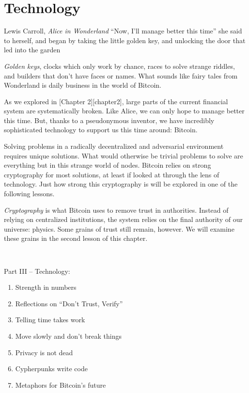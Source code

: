 \part{Technology}
\label{ch:technology}

\begin{chapquote}{Lewis Carroll, \textit{Alice in Wonderland}}
``Now, I'll manage better this time'' she said to herself, and began by taking
the little golden key, and unlocking the door that led into the garden
\end{chapquote}

\textit{Golden keys}, clocks which only work by chance, races to solve
strange riddles, and builders that don't have faces or names. What sounds like
fairy tales from Wonderland is daily business in the world of Bitcoin.

As we explored in [Chapter 2][chapter2], large parts of the current financial
system are systematically broken. Like Alice, we can only hope to manage better
this time. But, thanks to a pseudonymous inventor, we have incredibly
sophisticated technology to support us this time around: Bitcoin.

Solving problems in a radically decentralized and adversarial environment
requires unique solutions. What would otherwise be trivial problems to solve
are everything but in this strange world of nodes. Bitcoin relies on strong
cryptography for most solutions, at least if looked at through the lens of
technology. Just how strong this cryptography is will be explored in one of the
following lessons.

\textit{Cryptography} is what Bitcoin uses to remove trust in authorities.
Instead of relying on centralized institutions, the system relies on the final
authority of our universe: physics. Some grains of trust still remain, however.
We will examine these grains in the second lesson of this chapter.

~

Part III -- Technology:

\begin{enumerate}
  \item Strength in numbers
  \item Reflections on \enquote{Don't Trust, Verify}
  \item Telling time takes work
  \item Move slowly and don't break things
  \item Privacy is not dead
  \item Cypherpunks write code
  \item Metaphors for Bitcoin's future
\end{enumerate}

